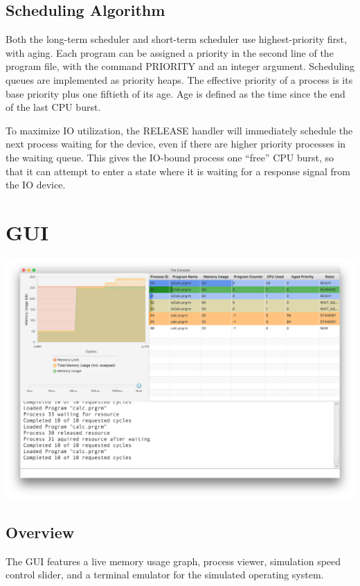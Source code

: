 \documentclass[paper=a4, fontsize=11pt]{scrartcl} %
\numberwithin{equation}{section} %
\numberwithin{figure}{section} %
\numberwithin{table}{section} %
\begin{document}
\subsection{Scheduling Algorithm}
Both the long-term scheduler and short-term scheduler use highest-priority first, with aging. Each program can be assigned a priority in the second line of the program file, with the command PRIORITY and an integer argument. Scheduling queues are implemented as priority heaps. The effective priority of a process is its base priority plus one fiftieth of its age. Age is defined as the time since the end of the last CPU burst. 

To maximize IO utilization, the RELEASE handler will immediately schedule the next process waiting for the device, even if there are higher priority processes in the waiting queue. This gives the IO-bound process one ``free'' CPU burst, so that it can attempt to enter a state where it is waiting for a response signal from the IO device.

\section{GUI}
\includegraphics[width=\textwidth]{Demo.png}
\subsection{Overview}
The GUI features a live memory usage graph, process viewer, simulation speed control slider, and a terminal emulator for the simulated operating system. 
\end{document}
